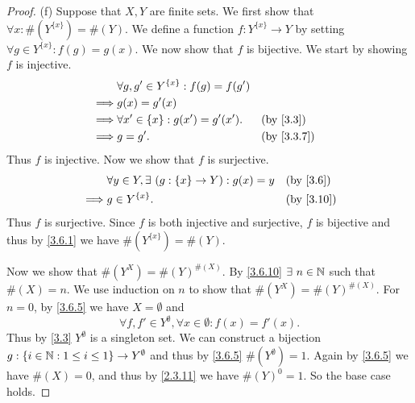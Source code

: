 \begin{proof}{(f)}
  Suppose that \(X, Y\) are finite sets.
  We first show that \(\forall x : \#(Y^{\{x\}}) = \#(Y)\).
  We define a function \(f : Y^{\{x\}} \to Y\) by setting \(\forall g \in Y^{\{x\}} : f(g) = g(x)\).
  We now show that \(f\) is bijective.
  We start by showing \(f\) is injective.
  \begin{align*}
             & \forall g, g' \in Y^{\{x\}} : f(g) = f(g')                             \\
    \implies & g(x) = g'(x)                                                           \\
    \implies & \forall x' \in \{x\} : g(x') = g'(x').     &  & \text{(by \cref{3.3})} \\
    \implies & g = g'.                                    &  & \by{3.3.7}
  \end{align*}
  Thus \(f\) is injective.
  Now we show that \(f\) is surjective.
  \begin{align*}
             & \forall y \in Y, \exists\ (g : \{x\} \to Y) : g(x) = y &  & \text{(by \cref{3.6})}  \\
    \implies & g \in Y^{\{x\}}.                                       &  & \text{(by \cref{3.10})}
  \end{align*}
  Thus \(f\) is surjective.
  Since \(f\) is both injective and surjective, \(f\) is bijective and thus by \cref{3.6.1} we have \(\#(Y^{\{x\}}) = \#(Y)\).

  Now we show that \(\#(Y^X) = \#(Y)^{\#(X)}\).
  By \cref{3.6.10} \(\exists\ n \in \N\) such that \(\#(X) = n\).
  We use induction on \(n\) to show that \(\#(Y^X) = \#(Y)^{\#(X)}\).
  For \(n = 0\), by \cref{3.6.5} we have \(X = \emptyset\) and
  \[
    \forall f, f' \in Y^\emptyset, \forall x \in \emptyset : f(x) = f'(x).
  \]
  Thus by \cref{3.3} \(Y^\emptyset\) is a singleton set.
  We can construct a bijection \(g : \{i \in \mathbb{N} : 1 \leq i \leq 1\} \to Y^\emptyset\) and thus by \cref{3.6.5} \(\#(Y^\emptyset) = 1\).
  Again by \cref{3.6.5} we have \(\#(X) = 0\), and thus by \cref{2.3.11} we have \(\#(Y)^0 = 1\).
  So the base case holds.


\end{proof}
